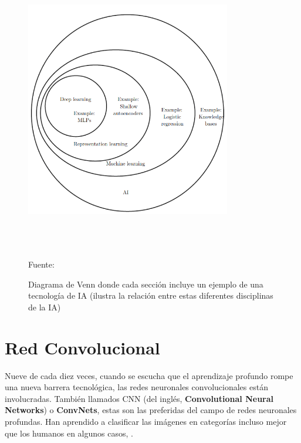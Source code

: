 	\begin{figure}[H]
		\begin{center}
		\includegraphics[width=0.8\textwidth, height=12.5cm]{images/marcoteorico/venn_diag}
		\end{center}
		\begin{center}
		\vskip -0.1cm
		\caption{\small{Diagrama de Venn donde cada sección incluye un ejemplo de una tecnología de IA (ilustra la relación entre estas diferentes disciplinas de la IA)}}
		{\small{Fuente: \cite{Goodfellow-et-al-2016}}}
		\end{center}
		\vspace{-1.5em}
		\end{figure}

\section{Red Convolucional} 

	Nueve de cada diez veces, cuando se escucha que el aprendizaje profundo rompe una nueva barrera tecnológica, las redes neuronales convolucionales están involucradas. También llamados CNN (del inglés, {\bf Convolutional Neural Networks}) o  {\bf ConvNets}, estas son las preferidas del campo de redes neuronales profundas. Han aprendido a clasificar las imágenes en categorías incluso mejor que los humanos en algunos casos, \citep{Rohrer}.
	
